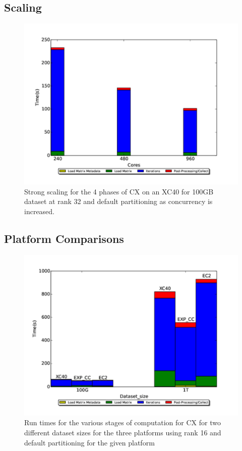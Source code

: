   \subsection{Scaling}
    \begin{figure} [H]
    \begin{centering}
    \includegraphics[scale=0.4]{images/CX_Strong_Scaling_Rank_32_Partitions_default.pdf}
    \end{centering}
    \caption{ Strong scaling for the 4 phases of CX on an XC40 for 100GB dataset at rank 32 and default partitioning as concurrency is increased.} 
    \end{figure} 


  \subsection{Platform Comparisons}
    
    \begin{figure} [H]
    \begin{centering}
    \includegraphics[scale=0.4]{images/CX_Size_Scaling_Rank_16_Partitions_default.pdf}
    \end{centering}
    \caption{ Run times for the various stages of computation for CX for two different dataset sizes for the three platforms using rank 16 and default partitioning for the given platform} 
    \label{fig:h2hrank16} 
    \end{figure}

